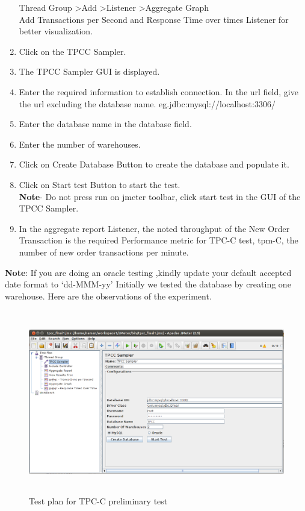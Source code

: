 \documentclass[12pt]{book}
\begin{document}
\begin{enumerate}
	Thread Group \textgreater Add \textgreater Listener \textgreater Aggregate Graph\\
	Add Transactions per Second and Response Time over times Listener for better visualization.\\
  \item Click on the TPCC Sampler. 
  \item The TPCC Sampler GUI is displayed.
  \item Enter the required information to establish connection. In the url field, give the url excluding the database name. eg.jdbc:mysql://localhost:3306/
  \item Enter the database name in the database field.
  \item Enter the number of warehouses.
  \item Click on Create Database Button to create the database and populate it.
  \item Click on Start test Button to start the test. \\
	\textbf{Note}- Do not press run on jmeter toolbar, click start test in the GUI of the TPCC Sampler.
  \item In the aggregate report Listener, the noted throughput of the New Order Transaction is the required Performance metric for TPC-C test, tpm-C, 
	the number of new order transactions per minute.
 \end{enumerate}
 
  \textbf{Note}: If you are doing an oracle testing ,kindly update your default accepted date format to ‘dd-MMM-yy’
  Initially we tested the database by creating one warehouse. Here are the observations of the experiment.\\
  
  \begin{figure}[H]
    \centering
    \includegraphics[width=15cm, height=8cm]{images/ntpcc_81}
    \caption{Test plan for TPC-C preliminary test\label{fig:fig65_JMeter}}
  \end{figure} 
   
\end{document}
